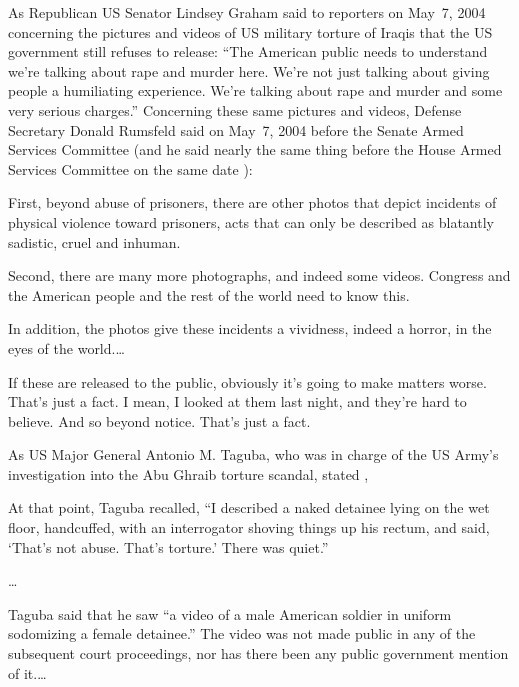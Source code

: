 \documentclass[letterpaper,12pt]{article}
\newenvironment{squotation}
  {\small\quotation}
  {\endquotation\normalsize}
\begin{document}
As Republican US Senator Lindsey Graham said \cite{Buncombe2004,Straub2004} to reporters on May~7, 2004 concerning the pictures and videos of US military torture of Iraqis that the US government still refuses to release: ``The American public needs to understand we're talking about rape and murder here. We're not just talking about giving people a humiliating experience. We're talking about rape and murder and some very serious charges.'' Concerning these same pictures and videos, Defense Secretary Donald Rumsfeld said \cite{FDCH2004} on May~7, 2004 before the Senate Armed Services Committee (and he said nearly the same thing before the House Armed Services Committee on the same date \cite{DOD2004}):

\begin{squotation}
First, beyond abuse of prisoners, there are other photos that depict incidents of physical violence toward prisoners, acts that can only be described as blatantly sadistic, cruel and inhuman.

Second, there are many more photographs, and indeed some videos. Congress and the American people and the rest of the world need to know this.

In addition, the photos give these incidents a vividness, indeed a horror, in the eyes of the world.\thinspace\ldots

If these are released to the public, obviously it's going to make matters worse. That's just a fact. I mean, I looked at them last night, and they're hard to believe. And so beyond notice. That's just a fact.\end{squotation}

As US Major General Antonio M. Taguba, who was in charge of the US Army's investigation \cite{Taguba2004} into the Abu Ghraib torture scandal, stated \cite{Hersh2007-06-25},

\begin{squotation}
At that point, Taguba recalled, ``I described a naked detainee lying on the wet floor, handcuffed, with an interrogator shoving things up his rectum, and said, `That's not abuse. That's torture.' There was quiet.''

\ldots

Taguba said that he saw ``a video of a male American soldier in uniform sodomizing a female detainee.'' The video was not made public in any of the subsequent court proceedings, nor has there been any public government mention of it.\thinspace\ldots
\end{squotation}
\end{document}
